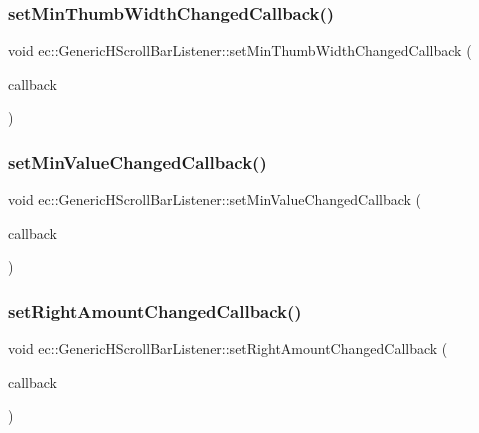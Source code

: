 \subsubsection{\texorpdfstring{set\+Min\+Thumb\+Width\+Changed\+Callback()}{setMinThumbWidthChangedCallback()}}
{\footnotesize\ttfamily void ec\+::\+Generic\+H\+Scroll\+Bar\+Listener\+::set\+Min\+Thumb\+Width\+Changed\+Callback (\begin{DoxyParamCaption}\item[{const \mbox{\hyperlink{classec_1_1_generic_h_scroll_bar_listener_a3bfa95b52b5ce492d638cef95b830227}{Min\+Thumb\+Width\+Changed\+\_\+\+Callback}} \&}]{callback }\end{DoxyParamCaption})}

\mbox{\label{classec_1_1_generic_h_scroll_bar_listener_ae2dde713f09d2f9953ef1aa0f2103804}} 
\subsubsection{\texorpdfstring{set\+Min\+Value\+Changed\+Callback()}{setMinValueChangedCallback()}}
{\footnotesize\ttfamily void ec\+::\+Generic\+H\+Scroll\+Bar\+Listener\+::set\+Min\+Value\+Changed\+Callback (\begin{DoxyParamCaption}\item[{const \mbox{\hyperlink{classec_1_1_generic_h_scroll_bar_listener_a0e75a452c9f937fb1539bdb395fb62a5}{Min\+Value\+Changed\+\_\+\+Callback}} \&}]{callback }\end{DoxyParamCaption})}

\mbox{\label{classec_1_1_generic_h_scroll_bar_listener_a483130cae3ea6a8b20c3b83ff0a6e996}} 
\subsubsection{\texorpdfstring{set\+Right\+Amount\+Changed\+Callback()}{setRightAmountChangedCallback()}}
{\footnotesize\ttfamily void ec\+::\+Generic\+H\+Scroll\+Bar\+Listener\+::set\+Right\+Amount\+Changed\+Callback (\begin{DoxyParamCaption}\item[{const \mbox{\hyperlink{classec_1_1_generic_h_scroll_bar_listener_a8fa94a611c4160acb1c5bc062046fc8a}{Right\+Amount\+Changed\+\_\+\+Callback}} \&}]{callback }\end{DoxyParamCaption})}

